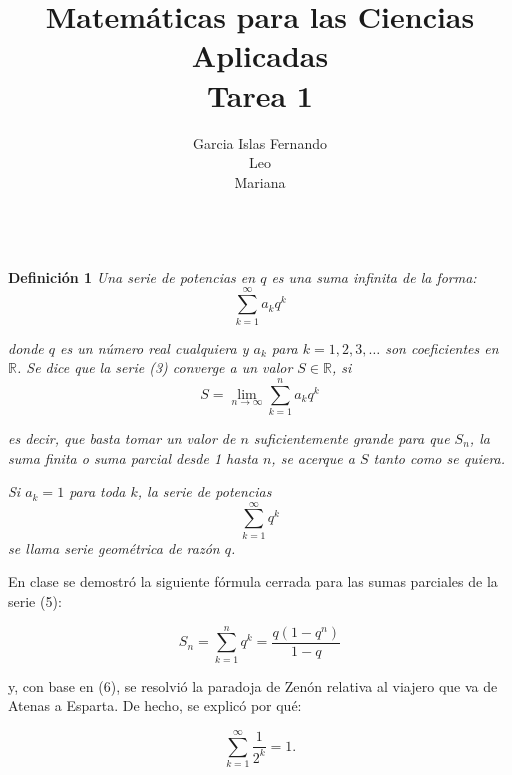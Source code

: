 \documentclass[12pt]{article}
\title{Matemáticas para las Ciencias Aplicadas \\ Tarea 1}
\date{}
\author{Garcia Islas Fernando \\ Leo\\Mariana}
\begin{document}
\maketitle

\\

    {\bf Definición 1} \textit{Una serie de potencias en $q$ es una suma infinita de la forma:}\[\sum_{k=1}^{\infty} a_k q^k \tag{3}\]

    \textit{donde $q$ es un número real cualquiera y $a_k$ para $k = 1, 2, 3, \dots$ son coeficientes en $\mathbb{R}$. Se dice que la serie (3) converge a un valor $S \in \mathbb{R}$, si}\[S = \lim_{n \to \infty} \sum_{k=1}^{n} a_k q^k \tag{4}\]


    \textit{es decir, que basta tomar un valor de $n$ suficientemente grande para que $S_n$, la suma finita o suma parcial desde 1 hasta $n$, se acerque a $S$ tanto como se quiera.}

    \textit{Si $a_k = 1$ para toda $k$, la serie de potencias}
    \[\sum_{k=1}^{\infty} q^k \tag{5}\]
    \textit{se llama serie geométrica de razón $q$.}


    En clase se demostró la siguiente fórmula cerrada para las sumas parciales de la serie (5):

    \[S_n = \sum_{k=1}^{n} q^k = \frac{q (1 - q^n)}{1 - q} \tag{6}\]

    y, con base en (6), se resolvió la paradoja de Zenón relativa al viajero que va de Atenas a Esparta. De hecho, se explicó por qué:

    \[\sum_{k=1}^{\infty} \frac{1}{2^k} = 1.\]
\end{document}
